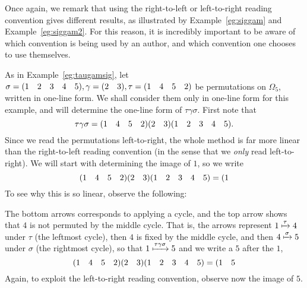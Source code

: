 Once again, we remark that using the right-to-left or left-to-right reading convention gives different results, as illustrated by Example~\ref{eg:siggam} and Example~\ref{eg:siggam2}. For this reason, it is incredibly important to be aware of which convention is being used by an author, and which convention one chooses to use themselves.

\begin{example}
    As in Example~\ref{eg:taugamsig}, let $\sigma = (1 \quad 2 \quad 3 \quad 4 \quad 5), \gamma = (2 \quad 3), \tau = (1 \quad 4 \quad 5 \quad 2)$ be permutations on $\Omega_{5}$, written in one-line form. We shall consider them only in one-line form for this example, and will determine the one-line form of $\tau\gamma\sigma$. First note that
    \[
    \tau\gamma\sigma = (1 \quad 4 \quad 5 \quad 2)(2 \quad 3)(1 \quad 2 \quad 3 \quad 4 \quad 5).
    \]
    Since we read the permutations left-to-right, the whole method is far more linear than the right-to-left reading convention (in the sense that we \textit{only} read left-to-right). We will start with determining the image of $1$, so we write
    \[
    (1 \quad 4 \quad 5 \quad 2)(2 \quad 3)(1 \quad 2 \quad 3 \quad 4 \quad 5) = (1
    \]
    To see why this is so linear, observe the following:

    \begin{figure}[h]
        \centering
    \end{figure}

    The bottom arrows corresponds to applying a cycle, and the top arrow shows that $4$ is not permuted by the middle cycle. That is, the arrows represent $1 \xmapsto{\tau} 4$ under $\tau$ (the leftmost cycle), then $4$ is fixed by the middle cycle, and then $4 \xmapsto{\sigma} 5$ under $\sigma$ (the rightmost cycle), so that $1 \xmapsto{\tau\gamma\sigma} 5$ and we write a $5$ after the $1$,
    \[
    (1 \quad 4 \quad 5 \quad 2)(2 \quad 3)(1 \quad 2 \quad 3 \quad 4 \quad 5) = (1 \quad 5
    \]
    Again, to exploit the left-to-right reading convention, observe now the image of $5$.


\end{example}
